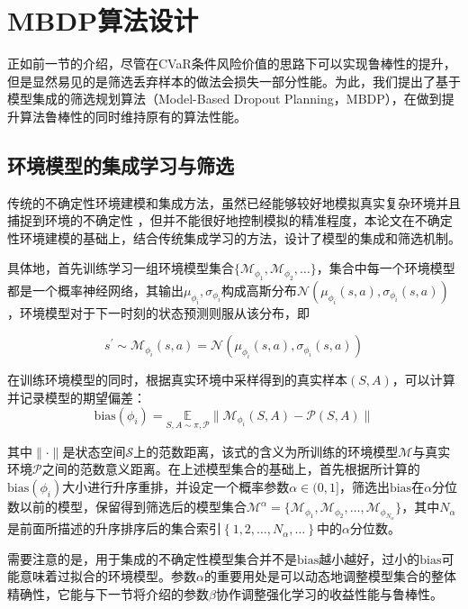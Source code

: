 \section{MBDP算法设计}

正如前一节的介绍，尽管在CVaR条件风险价值的思路下可以实现鲁棒性的提升，但是显然易见的是筛选丢弃样本的做法会损失一部分性能。为此，我们提出了基于模型集成的筛选规划算法（Model-Based Dropout Planning，MBDP），在做到提升算法鲁棒性的同时维持原有的算法性能。

\subsection{环境模型的集成学习与筛选}\label{sec:model-method}

传统的不确定性环境建模和集成方法，虽然已经能够较好地模拟真实复杂环境并且捕捉到环境的不确定性 \cite{duan2007multi}，但并不能很好地控制模拟的精准程度，本论文在不确定性环境建模的基础上，结合传统集成学习的方法，设计了模型的集成和筛选机制。

具体地，首先训练学习一组环境模型集合$\{\mathcal{M}_{\phi_1},\mathcal{M}_{\phi_2},\ldots\}$，集合中每一个环境模型都是一个概率神经网络，其输出$\mu_{\phi_i},\sigma_{\phi_i}$构成高斯分布$\mathcal{N}(\mu_{\phi_i}(s,a),\sigma_{\phi_i}(s,a))$，环境模型对于下一时刻的状态预测则服从该分布，即

\begin{equation}
    s^\prime \sim \mathcal{M}_{\phi_i}(s,a) = \mathcal{N}(\mu_{\phi_i}(s,a),\sigma_{\phi_i}(s,a))
\end{equation}

在训练环境模型的同时，根据真实环境中采样得到的真实样本$(S,A)$，可以计算并记录模型的期望偏差：
\begin{equation}
    \mathrm{bias}(\phi_i) = \underset{S,A\sim \pi,\mathcal{P}}{\mathbb{E}}\|\mathcal{M}_{\phi_i}(S,A)-\mathcal{P}(S,A)\|
\end{equation}

其中$\|\cdot\|$是状态空间$\mathcal{S}$上的范数距离，该式的含义为所训练的环境模型$\mathcal{M}$与真实环境$\mathcal{P}$之间的范数意义距离。在上述模型集合的基础上，首先根据所计算的$\mathrm{bias}(\phi_i)$大小进行升序重排，并设定一个概率参数$\alpha\in(0,1]$，筛选出$\mathrm{bias}$在$\alpha$分位数以前的模型，保留得到筛选后的模型集合$\mathcal{M}^\alpha = \{\mathcal{M}_{\phi_1},\mathcal{M}_{\phi_2},\ldots,\mathcal{M}_{\phi_{N_\alpha}}\}$，其中$N_\alpha$是前面所描述的升序排序后的集合索引$\left\{1,2,\ldots,N_\alpha,\ldots\right\}$中的$\alpha$分位数。

需要注意的是，用于集成的不确定性模型集合并不是$\mathrm{bias}$越小越好，过小的$\mathrm{bias}$可能意味着过拟合的环境模型。参数$\alpha$的重要用处是可以动态地调整模型集合的整体精确性，它能与下一节将介绍的参数$\beta$协作调整强化学习的收益性能与鲁棒性。

